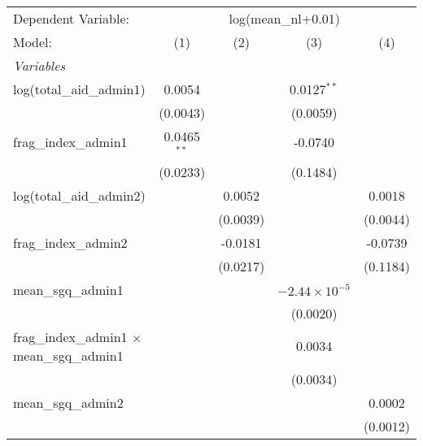\begingroup
\centering
\begin{tabular}{lcccc}
   \tabularnewline \midrule \midrule
   Dependent Variable: & \multicolumn{4}{c}{log(mean\_nl+0.01)}\\
   Model:                                              & (1)           & (2)      & (3)                    & (4)\\  
   \midrule
   \emph{Variables}\\
   log(total\_aid\_admin1)                             & 0.0054        &          & 0.0127$^{**}$          &   \\   
                                                       & (0.0043)      &          & (0.0059)               &   \\   
   frag\_index\_admin1                                 & 0.0465$^{**}$ &          & -0.0740                &   \\   
                                                       & (0.0233)      &          & (0.1484)               &   \\   
   log(total\_aid\_admin2)                             &               & 0.0052   &                        & 0.0018\\   
                                                       &               & (0.0039) &                        & (0.0044)\\   
   frag\_index\_admin2                                 &               & -0.0181  &                        & -0.0739\\   
                                                       &               & (0.0217) &                        & (0.1184)\\   
   mean\_sgq\_admin1                                   &               &          & $-2.44\times 10^{-5}$  &   \\   
                                                       &               &          & (0.0020)               &   \\   
   frag\_index\_admin1 $\times$ mean\_sgq\_admin1      &               &          & 0.0034                 &   \\   
                                                       &               &          & (0.0034)               &   \\   
   mean\_sgq\_admin2                                   &               &          &                        & 0.0002\\   
                                                       &               &          &                        & (0.0012)\\   

\end{tabular}

